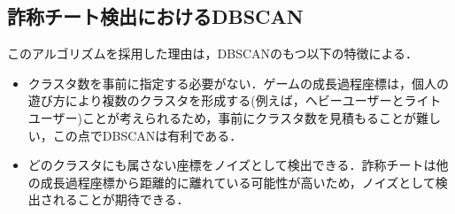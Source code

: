\subsection{詐称チート検出におけるDBSCAN}
このアルゴリズムを採用した理由は，DBSCANのもつ以下の特徴による．

\begin{itemize}
\item
クラスタ数を事前に指定する必要がない．ゲームの成長過程座標は，個人の遊び方により複数のクラスタを形成する(例えば，ヘビーユーザーとライトユーザー)ことが考えられるため，事前にクラスタ数を見積もることが難しい，この点でDBSCANは有利である．
\item
どのクラスタにも属さない座標をノイズとして検出できる．詐称チートは他の成長過程座標から距離的に離れている可能性が高いため，ノイズとして検出されることが期待できる．
\end{itemize}
